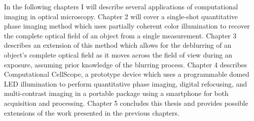 In the following chapters I will describe several applications of computational imaging in optical microscopy. Chapter 2 will cover a single-shot quantitative phase imaging method which uses partially coherent color illumination to recover the complete optical field of an object from a single measurement. Chapter 3 describes an extension of this method which allows for the deblurring of an object's complete optical field as it moves across the field of view during an exposure, assuming prior knowledge of the blurring process. Chapter 4 describes Computational CellScope, a prototype device which uses a programmable domed LED illumination to perform quantitative phase imaging, digital refocusing, and multi-contrast imaging in a portable package using a smartphone for both acquisition and processing. Chapter 5 concludes this thesis and provides possible extensions of the work presented in the previous chapters.
